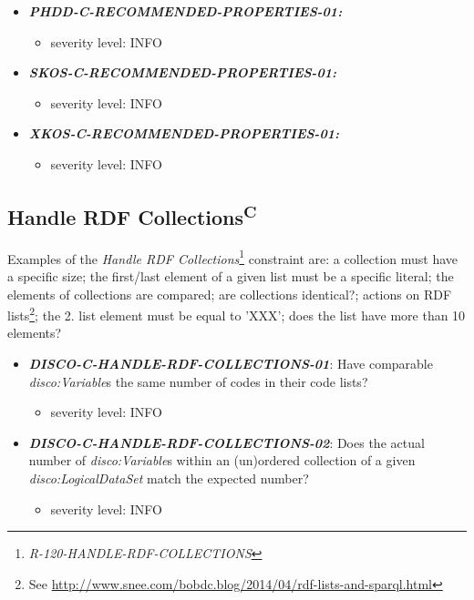 \documentclass{llncs}
\begin{document}
\begin{itemize}
	\item \textbf{{\em PHDD-C-RECOMMENDED-PROPERTIES-01:}}
	\begin{itemize}
		\item severity level: INFO
	\end{itemize}
\end{itemize}

\begin{itemize}
	\item \textbf{{\em SKOS-C-RECOMMENDED-PROPERTIES-01:}}
	\begin{itemize}
		\item severity level: INFO
	\end{itemize}
\end{itemize}

\begin{itemize}
	\item \textbf{{\em XKOS-C-RECOMMENDED-PROPERTIES-01:}}
	\begin{itemize}
		\item severity level: INFO
	\end{itemize}
\end{itemize}

\subsection{Handle RDF Collections\textsuperscript{C}}

Examples of the \emph{Handle RDF Collections}\footnote{\emph{R-120-HANDLE-RDF-COLLECTIONS}} constraint are: a collection must have a specific size; the first/last element of a given list must be a specific literal; the elements of collections are compared; are collections identical?; actions on RDF lists\footnote{See \url{http://www.snee.com/bobdc.blog/2014/04/rdf-lists-and-sparql.html}}; the 2. list element must be equal to 'XXX'; does the list have more than 10 elements?

\begin{itemize}
	\item \textbf{{\em DISCO-C-HANDLE-RDF-COLLECTIONS-01}}: Have comparable \emph{disco:Variable}s the same number of codes in their code lists?
	\begin{itemize}
		\item severity level: INFO
	\end{itemize}
	\item \textbf{{\em DISCO-C-HANDLE-RDF-COLLECTIONS-02}}: Does the actual number of \emph{disco:Variable}s within an (un)ordered collection of a given \emph{disco:LogicalDataSet} match the expected number? 
	\begin{itemize}
		\item severity level: INFO
	\end{itemize}
\end{itemize}
\end{document}
